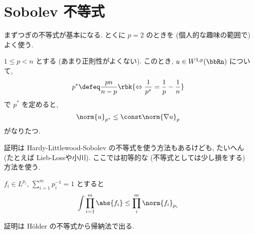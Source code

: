 \documentclass[openany, a4paper, oneside]{jsbook}
\begin{document}
\section{Sobolev 不等式}

まずつぎの不等式が基本になる. とくに $p=2$ のときを (個人的な趣味の範囲で) よく使う.
\begin{thm}\label{yukimi-introduction-to-sobolev-embedding-theorems2}
 $1 \le p < n$ とする (あまり正則性がよくない).
 このとき, $u \in W^{1, p}(\bbRn)$ について,
\begin{align}
 p^*
 \defeq
 \frac{pn}{n-p}
  \rbk{\Leftrightarrow \frac{1}{p^*} = \frac{1}{p} - \frac{1}{n}}
\end{align}
で $p^*$ を定めると,
\begin{align}
 \norm{u}_{p^*} \le \const \norm{\nabla u}_p
\end{align}
 がなりたつ.
\end{thm}
証明は Hardy-Littlewood-Sobolev の不等式を使う方法もあるけども,
たいへん (たとえば Lieb-Loss\cite{LiebLoss1}や小川\cite{TakayoshiOgawa1}).
ここでは初等的な (不等式としては少し損をする) 方法を使う.
\begin{lem}
 $f_i \in L^{p_i}$, $\sum_{i=1}^m p_i^{-1} = 1$ とすると
 \begin{align}
  \int \prod_{i=1}^m \abs{f_i}
  \le
  \prod_i^m \norm{f_i}_{p_i}
 \end{align}
\end{lem}
証明は H\"older の不等式から帰納法で出る.
\end{document}
